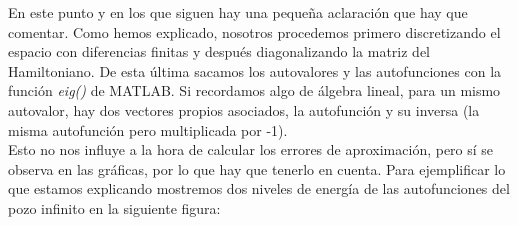 \documentclass[12pt]{article}
\begin{document}
En este punto y en los que siguen hay una pequeña aclaración que hay que comentar. Como hemos explicado, nosotros procedemos primero discretizando el espacio con diferencias finitas y después diagonalizando la matriz del Hamiltoniano. De esta última sacamos los autovalores y las autofunciones con la función \textit{eig()} de MATLAB. Si recordamos algo de álgebra lineal, para un mismo autovalor, hay dos vectores propios asociados, la autofunción y su inversa (la misma autofunción pero multiplicada por -1).\\

Esto no nos influye a la hora de calcular los errores de aproximación, pero sí se observa en las gráficas, por lo que hay que tenerlo en cuenta. Para ejemplificar lo que estamos explicando mostremos dos niveles de energía de las autofunciones del pozo infinito en la siguiente figura:
        
\end{document}
